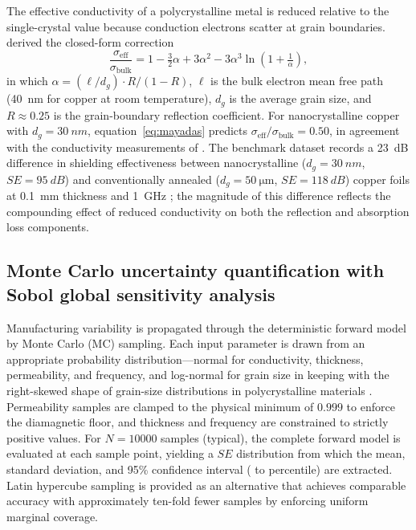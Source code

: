 \documentclass[review,3p,authoryear]{elsarticle}
\begin{document}
The effective conductivity of a polycrystalline metal is reduced relative to the single-crystal value because conduction electrons scatter at grain boundaries. \citet{Mayadas1970} derived the closed-form correction
\begin{equation}
\frac{\sigma_{\mathrm{eff}}}{\sigma_{\mathrm{bulk}}}
= 1 - \tfrac{3}{2}\alpha + 3\alpha^2 - 3\alpha^3\ln\!\left(1 + \tfrac{1}{\alpha}\right),
\label{eq:mayadas}
\end{equation}
in which $\alpha = (\ell/d_g) \cdot R/(1-R)$, $\ell$ is the bulk electron mean free path (\SI{40}{nm} for copper at room temperature), $d_g$ is the average grain size, and $R \approx 0.25$ is the grain-boundary reflection coefficient. For nanocrystalline copper with $d_g = \SI{30}{nm}$, equation~\eqref{eq:mayadas} predicts $\sigma_{\mathrm{eff}}/\sigma_{\mathrm{bulk}} = 0.50$, in agreement with the conductivity measurements of \citet{Mayadas1970}. The benchmark dataset records a \SI{23}{dB} difference in shielding effectiveness between nanocrystalline ($d_g = \SI{30}{nm}$, $SE = \SI{95}{dB}$) and conventionally annealed ($d_g = \SI{50}{\micro\metre}$, $SE = \SI{118}{dB}$) copper foils at \SI{0.1}{mm} thickness and \SI{1}{GHz} \citep{Mayadas1970, Schulz1988}; the magnitude of this difference reflects the compounding effect of reduced conductivity on both the reflection and absorption loss components.

\subsection{Monte Carlo uncertainty quantification with Sobol global sensitivity analysis}
\label{sec:mc}

Manufacturing variability is propagated through the deterministic forward model by Monte Carlo (MC) sampling. Each input parameter is drawn from an appropriate probability distribution---normal for conductivity, thickness, permeability, and frequency, and log-normal for grain size in keeping with the right-skewed shape of grain-size distributions in polycrystalline materials \citep{Pande1993}. Permeability samples are clamped to the physical minimum of $0.999$ to enforce the diamagnetic floor, and thickness and frequency are constrained to strictly positive values. For $N = \num{10000}$ samples (typical), the complete forward model is evaluated at each sample point, yielding a $SE$ distribution from which the mean, standard deviation, and 95\% confidence interval ( to  percentile) are extracted. Latin hypercube sampling \citep{McKay1979} is provided as an alternative that achieves comparable accuracy with approximately ten-fold fewer samples by enforcing uniform marginal coverage.
\end{document}
